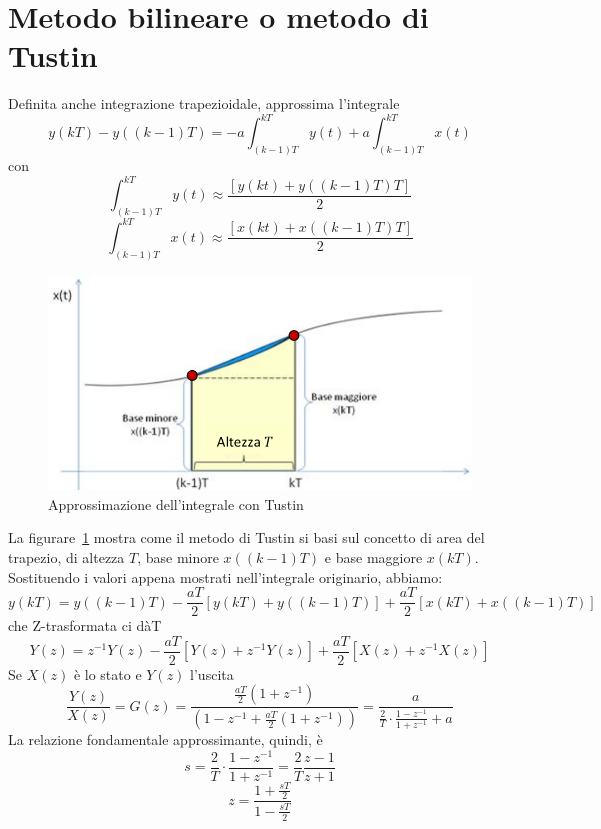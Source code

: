 \documentclass[a4paper]{report}
\begin{document}
\section{Metodo bilineare o metodo di Tustin}
Definita anche integrazione trapezioidale, approssima l'integrale
\[
y(kT) - y((k - 1)T) = - a\int_{(k - 1)T}^{kT} y(t) + a\int_{(k -
  1)T}^{kT}x(t) 
\]
con
\[
\int_{(k - 1)T}^{kT} y(t) \approx \dfrac{[y(kt) + y((k - 1)T)T]}{2}
\]
\[
\int_{(k - 1)T}^{kT}x(t) \approx \dfrac{[x(kt) + x((k - 1)T)T]}{2}
\]
\begin{figure}[!h]
  \begin{center}
    \includegraphics[scale=0.4]{./figures/discretizzazioneTustin00.png}
    \caption{Approssimazione dell'integrale con
      Tustin}\label{fig:discretizzazioneTustin00} 
  \end{center}
\end{figure}
La figurare~\ref{fig:discretizzazioneTustin00} mostra come il metodo
di Tustin si basi sul concetto di area del trapezio, di altezza $T$,
base minore $ x((k - 1)T)$ e base maggiore $x(kT)$. Sostituendo i
valori appena mostrati nell'integrale originario, abbiamo:
\[
y(kT) = y((k - 1)T) - \dfrac{aT}{2}[y(kT) + y((k - 1)T)] +
\dfrac{aT}{2}[x(kT) + x((k - 1)T)]
\]
che Z-trasformata ci d\`aT
\[
Y(z) = z^{-1}Y(z) - \dfrac{aT}{2}\left[Y(z) + z^{-1}Y(z)\right] +
\dfrac{aT}{2}\left[X(z) + z^{-1}X(z)\right]
\]
Se $X(z)$ \`e lo stato e $Y(z)$ l'uscita
\[
\dfrac{Y(z)}{X(z)} = G(z) = \dfrac{\frac{aT}{2} (1 + z^{-1})}{(1 -
  z^{-1} + \frac{aT}{2}(1 + z^{-1}))} = \dfrac{a}{\frac{2}{T}\cdot
  \frac{1 - z^{-1}}{1 + z^{-1}} + a}
\]
La relazione fondamentale approssimante, quindi, \`e
\begin{equation}\label{eq:discretizzazioneTustin00}
  s = \dfrac{2}{T}\cdot\dfrac{1 - z^{-1}}{1 + z^{-1}} =
  \dfrac{2}{T}\dfrac{z - 1}{z + 1}
\end{equation}
\begin{equation}\label{eq:discretizzazioneTustin01}
  z = \dfrac{1 + \frac{sT}{2}}{1 - \frac{sT}{2}}
\end{equation}
\end{document}

